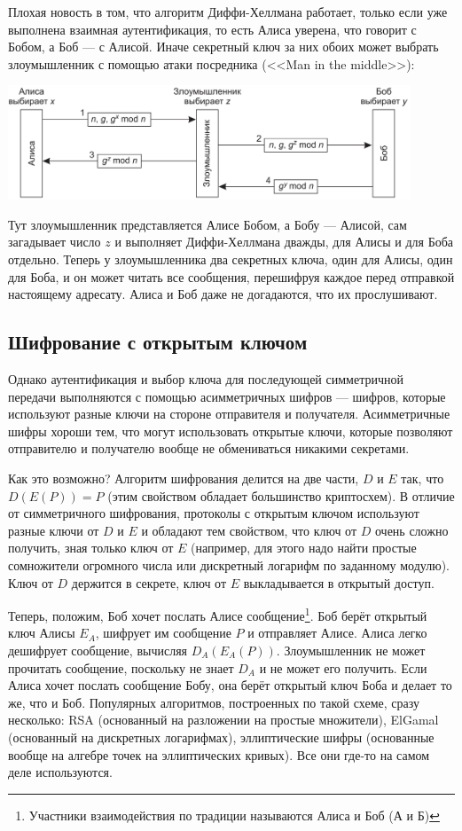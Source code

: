 \documentclass{../mcstext}
\begin{document}
Плохая новость в том, что алгоритм Диффи-Хеллмана работает, только если уже выполнена взаимная аутентификация, то есть Алиса уверена, что говорит с Бобом, а Боб --- с Алисой. Иначе секретный ключ за них обоих может выбрать злоумышленник с помощью атаки посредника (<<Man in the middle>>):

\begin{center}
    \includegraphics[width=0.9\textwidth]{diffieHellmanMitm.png}
\end{center}

Тут злоумышленник представляется Алисе Бобом, а Бобу --- Алисой, сам загадывает число $z$ и выполняет Диффи-Хеллмана дважды, для Алисы и для Боба отдельно. Теперь у злоумышленника два секретных ключа, один для Алисы, один для Боба, и он может читать все сообщения, перешифруя каждое перед отправкой настоящему адресату. Алиса и Боб даже не догадаются, что их прослушивают.

\subsection{Шифрование с открытым ключом}

Однако аутентификация и выбор ключа для последующей симметричной передачи выполняются с помощью асимметричных шифров --- шифров, которые используют разные ключи на стороне отправителя и получателя. Асимметричные шифры хороши тем, что могут использовать открытые ключи, которые позволяют отправителю и получателю вообще не обмениваться никакими секретами. 

Как это возможно? Алгоритм шифрования делится на две части, $D$ и $E$ так, что $D(E(P)) = P$ (этим свойством обладает большинство криптосхем). В отличие от симметричного шифрования, протоколы с открытым ключом используют разные ключи от $D$ и $E$ и обладают тем свойством, что ключ от $D$ очень сложно получить, зная только ключ от $E$ (например, для этого надо найти простые сомножители огромного числа или дискретный логарифм по заданному модулю). Ключ от $D$ держится в секрете, ключ от $E$ выкладывается в открытый доступ.

Теперь, положим, Боб хочет послать Алисе сообщение\footnote{Участники взаимодействия по традиции называются Алиса и Боб (А и Б)}. Боб берёт открытый ключ Алисы $E_A$, шифрует им сообщение $P$ и отправляет Алисе. Алиса легко дешифрует сообщение, вычисляя $D_A(E_A(P))$. Злоумышленник не может прочитать сообщение, поскольку не знает $D_A$ и не может его получить. Если Алиса хочет послать сообщение Бобу, она берёт открытый ключ Боба и делает то же, что и Боб. Популярных алгоритмов, построенных по такой схеме, сразу несколько: RSA (основанный на разложении на простые множители), ElGamal (основанный на дискретных логарифмах), эллиптические шифры (основанные вообще на алгебре точек на эллиптических кривых). Все они где-то на самом деле используются.
\end{document}
